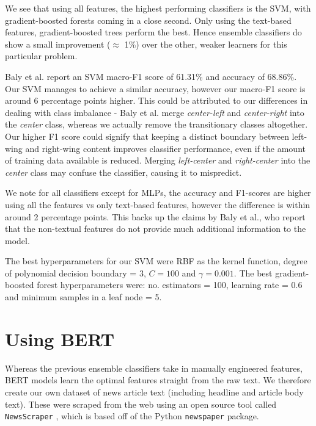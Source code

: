 We see that using all features, the highest performing classifiers is the SVM, with gradient-boosted forests coming in a close second. Only using the text-based features, gradient-boosted trees perform the best. Hence ensemble classifiers do show a small improvement ($ \approx $ 1\%) over the other, weaker learners for this particular problem.


Baly et al. report an SVM macro-F1 score of 61.31\% and accuracy of 68.86\%. Our SVM manages to achieve a similar accuracy, however our macro-F1 score is around 6 percentage points higher. This could be attributed to our differences in dealing with class imbalance - Baly et al. merge \textit{center-left} and \textit{center-right} into the \textit{center} class, whereas we actually remove the transitionary classes altogether. Our higher F1 score could signify that keeping a distinct boundary between left-wing and right-wing content improves classifier performance, even if the amount of training data available is reduced. Merging \textit{left-center} and \textit{right-center} into the \textit{center} class may confuse the classifier, causing it to mispredict.

We note for all classifiers except for MLPs, the accuracy and F1-scores are higher using all the features vs only text-based features, however the difference is within around 2 percentage points. This backs up the claims by Baly et al., who report that the non-textual features do not provide much additional information to the model.

The best hyperparameters for our SVM were RBF as the kernel function, degree of polynomial decision boundary = 3, $ C = 100 $ and $ \gamma = 0.001 $. The best gradient-boosted forest hyperparameters were: no. estimators = 100, learning rate = 0.6 and minimum samples in a leaf node = 5.

\section{Using BERT} \label{sec:nmr-bert}

Whereas the previous ensemble classifiers take in manually engineered features, BERT models learn the optimal features straight from the raw text. We therefore create our own dataset of news article text (including headline and article body text). These were scraped from the web using an open source tool called \texttt{NewsScraper} \cite{newsscraper}, which is based off of the Python \texttt{newspaper} \cite{newspaper-python} package.

